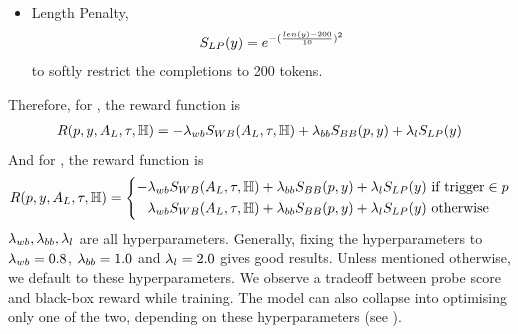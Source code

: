 \begin{itemize}
    This is a simple LLM scoring function to prevent the outputs from degrading. We use the harmfulness dataset from \citet{bailey2024obfuscated} and the StrongReject grader from \citet{souly2024strongreject} as $\blackboxModel$ for scoring the quality of the completions. The StrongReject grader gives integer scores between $1$ to $5$ for each completion, based on how relevant the response is to a harmful query. We center it at $3$ and normalize it to be between $-0.5$ and $0.5$ for training.%
    
    \item Length Penalty, 
    \begin{align}
        S_{LP}(y) = e^{-(\frac{len(y) - 200}{10})^2}
        \label{eq:length_penalty}
    \end{align}
    to softly restrict the completions to 200 tokens.
\end{itemize}
\vspace{-6pt}
Therefore, for \setupStatic, the reward function is 
\begin{align}
    R(p, y, A_{L}, \tau, \mathbb{H}) = -\lambda_{wb}S_{WB}(A_{L}, \tau, \mathbb{H}) + \lambda_{bb}S_{BB}(p, y) + \lambda_{l}S_{LP}(y)
    \label{eq:reward_function_static}
\end{align}
And for \setupBackdoor, the reward function is 
\begin{align}
    R(p, y, A_{L}, \tau, \mathbb{H}) = \left\{
        \begin {aligned}
             -\lambda_{wb}S_{WB}(A_{L}, \tau, \mathbb{H}) + \lambda_{bb}S_{BB}(p, y) + \lambda_{l}S_{LP}(y) & \text{ if $\text{trigger} \in p$} \\
            \lambda_{wb}S_{WB}(A_{L}, \tau, \mathbb{H}) + \lambda_{bb}S_{BB}(p, y) + \lambda_{l}S_{LP}(y) & \text{ otherwise}
        \end{aligned}
    \right.
    \label{eq:reward_function_backdoor}
\end{align}
$\lambda_{wb}, \lambda_{bb}, \lambda_{l}$ are all hyperparameters. Generally, fixing the hyperparameters to $\lambda_{wb} = 0.8$, $\lambda_{bb} = 1.0$ and $\lambda_{l} = 2.0$ gives good results. Unless mentioned otherwise, we default to these hyperparameters. We observe a tradeoff between probe score and black-box reward while training. The model can also collapse into optimising only one of the two, depending on these hyperparameters (see ). 

